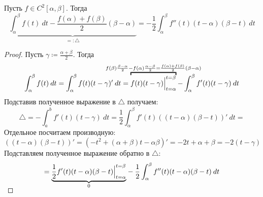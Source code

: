 \begin{lemma}
    Пусть $f \in C^{2}[\alpha, \beta]$. Тогда
    \begin{equation*}
        \underbrace{\int_{\alpha}^{\beta} f(t) \: dt - \frac{f(\alpha) + f(\beta)}{2}(\beta - \alpha)}_{=: \triangle} =
        -\frac{1}{2} \int_{\alpha}^{\beta} f''(t)(t - \alpha)(\beta - t) \: dt
    \end{equation*}
\end{lemma}
\begin{proof}
    Пусть $\gamma \coloneqq \frac{\alpha + \beta}{2}$. Тогда
    \begin{equation*}
            \int_{\alpha}^{\beta} f(t) \: dt = \int_{\alpha}^{\beta} f(t)(t - \gamma)'
            \: dt = \overbracket{f(t)(t - \gamma) \Big|_{t = \alpha}^{t = \beta}}^
            {\mathclap{f(\beta)\frac{\beta - \alpha}{2} - f(\alpha)\frac{\alpha - \beta}{2}
            = \frac{f(\alpha) + f(\beta)}{2}(\beta - \alpha)}}
            -\int_{\alpha}^{\beta} f'(t)(t - \gamma) \: dt
    \end{equation*}
    Подставив полученное выражение в $\triangle$ получаем:
    \begin{equation*}
            \triangle = - \int_{a}^{b} f'(t)(t - \gamma) \: dt = \frac{1}{2}
            \int_{{\alpha}}^{{\beta}} {f'(t)((t - \alpha)(\beta - t))'} \: d{t}
            =
    \end{equation*}
    Отдельное посчитаем производную:
    \begin{equation*}
            ((t - \alpha)(\beta - t))' = (-t^2 + (\alpha + \beta)t - \alpha\beta)' =
            -2t + \alpha + \beta = -2(t - \gamma)
    \end{equation*}
    Подставляем полученное выражение обратно в $\triangle$:
    \begin{equation*}
            =
            \smash{\underbrace{\frac{1}{2} f'(t)(t - \alpha)(\beta - t) \Big|_{t = \alpha}^{t = \beta}}_{0}}
            - \frac{1}{2} \int_{{\alpha}}^{{\beta}} {f''(t)(t - \alpha)(\beta - t)} \: d{t}
    \end{equation*}
\end{proof}

